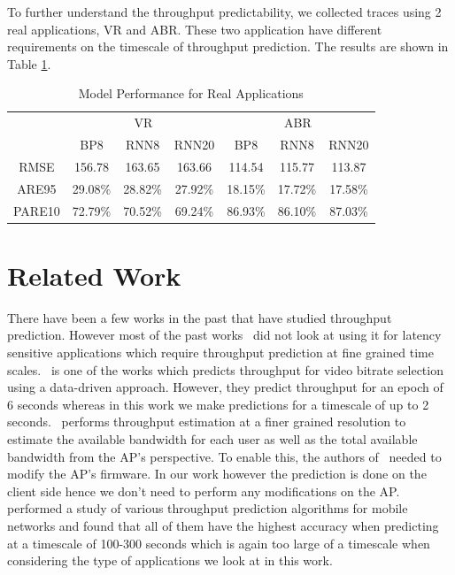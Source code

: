\documentclass[sigconf,anonymous]{acmart}
\begin{document}
To further understand the throughput predictability, we collected traces using 2 real applications, VR and ABR. These two application have different requirements on the timescale of throughput prediction. The results are shown in Table \ref{tab: Model Performance for Real Applications}.

\begin{table}[h!]
\caption{Model Performance for Real Applications}
\label{tab: Model Performance for Real Applications}
\begin{tabular}{c|c c c|c c c}
\toprule
 & \multicolumn{3}{c|}{VR} & \multicolumn{3}{c}{ABR}\\
 & BP8 & RNN8 & RNN20 & BP8 & RNN8 & RNN20 \\
\midrule
RMSE & 156.78 & 163.65 & 163.66 & 114.54 & 115.77 & 113.87 \\
ARE95 & 29.08\% & 28.82\% & 27.92\% & 18.15\% & 17.72\% & 17.58\% \\
PARE10 & 72.79\% & 70.52\% & 69.24\% & 86.93\% & 86.10\% & 87.03\% \\
\bottomrule
\end{tabular}
\end{table}

\section{Related Work} %

There have been a few works in the past that have studied throughput prediction. However most of the past works~\cite{mirza:sigmetrics2007, bui:ewc2014, liu:globecom2015} did not look at using it for latency sensitive applications which require throughput prediction at fine grained time scales.~\cite{sun:sigcomm2016} is one of the works which predicts throughput for video bitrate selection using a data-driven approach. However, they predict throughput for an epoch of 6 seconds whereas in this work we make predictions for a timescale of up to 2 seconds.~\cite{liu:atc2020} performs throughput estimation at a finer grained resolution to estimate the available bandwidth for each user as well as the total available bandwidth from the AP's perspective. To enable this, the authors of~\cite{liu:atc2020} needed to modify the AP's firmware. In our work however the prediction is done on the client side hence we don't need to perform any modifications on the AP.~\cite{liu:globecom2015} performed a study of various throughput prediction algorithms for mobile networks and found that all of them have the highest accuracy when predicting at a timescale of 100-300 seconds which is again too large of a timescale when considering the type of applications we look at in this work.
\end{document}
